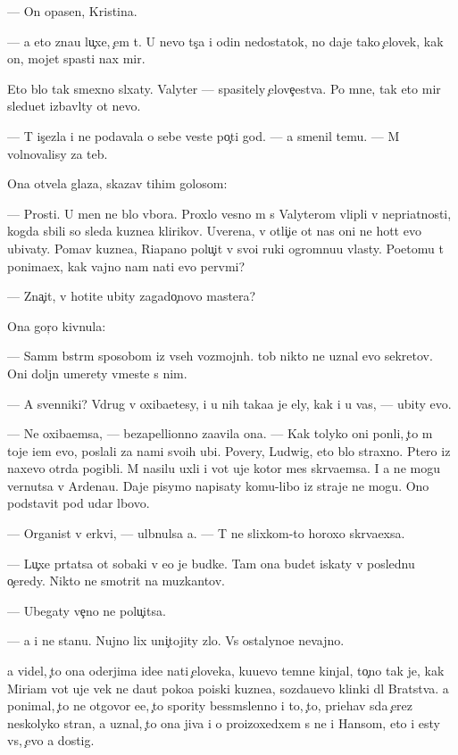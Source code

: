\documentclass[10pt]{book}
\begin{document}
— On opasen, Kristina.

— {\Y}a eto zna{\y}u lu{\c}xe, {\c}em t{\yi}. U nevo t{\yi}s{\ia}{\c}a i odin nedostatok, no daje tako{\y} {\c}elovek, kak on, mojet spasti nax mir.

Eto b{\yi}lo tak smexno sl{\yi}xaty. Valyter — spasitely {\c}elove{\c}estva. Po mne, tak eto mir sledu{\y}et izbavl{\ia}ty ot nevo.

— T{\yi} is{\c}ezla i ne podavala o sebe veste{\y} po{\c}ti god. — {\Y}a smenil temu. — M{\yi} volnovalisy za teb{\ia}.

Ona otvela glaza, skazav tihim golosom:

— Prosti. U men{\ia} ne b{\yi}lo v{\yi}bora. Proxlo{\y} vesno{\y} m{\yi} s Valyterom vlipli v nepri{\y}atnosti, kogda sbili so sleda kuzne{\q}a klirikov. Uverena, v otli{\c}i{\y}e ot nas oni ne hot{\ia}t {\y}evo ubivaty. Po{\y}mav kuzne{\q}a, Riapano polu{\c}it v svo{\y}i ruki ogromnu{\y}u vlasty. Poetomu t{\yi} ponima{\y}ex, kak vajno nam na{\y}ti {\y}evo perv{\yi}mi?

— Zna{\c}it, v{\yi} hotite ubity zagado{\c}novo mastera?

Ona gor{\ia}{\c}o kivnula:

— Sam{\yi}m b{\yi}str{\yi}m sposobom iz vseh vozmojn{\yi}h. {\C}tob{\yi} nikto ne uznal {\y}evo sekretov. Oni doljn{\yi} umerety vmeste s nim.

— A sv{\ia}{\x}enniki? Vdrug v{\yi} oxiba{\y}etesy, i u nih taka{\y}a je {\q}ely, kak i u vas, — ubity {\y}evo.

— Ne oxiba{\y}emsa, — bezapell{\ia}{\q}ionno za{\y}avila ona. — Kak tolyko oni pon{\ia}li, {\c}to m{\yi} toje i{\x}em {\y}evo, poslali za nami svo{\y}ih ubi{\y}{\q}. Povery, Ludwig, eto b{\yi}lo straxno. P{\ia}tero iz naxevo otr{\ia}da pogibli. M{\yi} nasilu uxli i vot uje kotor{\yi}{\y} mes{\ia}{\q} skr{\yi}va{\y}emsa. I {\y}a ne mogu vernutsa v Ardenau. Daje pisymo napisaty komu-libo iz straje{\y} ne mogu. Ono podstavit pod udar l{\iu}bovo.

— Organist v {\q}erkvi, — ul{\yi}bnulsa {\y}a. — T{\yi} ne slixkom-to horoxo skr{\yi}va{\y}exsa.

— Lu{\c}xe pr{\ia}tatsa ot sobaki v {\y}e{\y}o je budke. Tam ona budet iskaty v posledn{\iu}{\y}u o{\c}eredy. Nikto ne smotrit na muz{\yi}kantov.

— Ubegaty ve{\c}no ne polu{\c}itsa.

— {\Y}a i ne stanu. Nujno lix uni{\c}tojity zlo. Vs{\e} ostalyno{\y}e nevajno.

{\Y}a videl, {\c}to ona oderjima ide{\y}e{\y} na{\y}ti {\c}eloveka, ku{\y}u{\x}evo temn{\yi}{\y}e kinjal{\yi}, to{\c}no tak je, kak Miriam vot uje vek ne da{\y}ut poko{\y}a poiski kuzne{\q}a, sozda{\y}u{\x}evo klinki dl{\ia} Bratstva. {\Y}a ponimal, {\c}to ne otgovor{\iu} {\y}e{\y}e, {\c}to spority bessm{\yi}slenno i to, {\c}to, pri{\y}ehav s{\iu}da {\c}erez neskolyko stran, {\y}a uznal, {\c}to ona jiva i o proizoxedxem s ne{\y} i Hansom, eto i {\y}esty vs{\e}, {\c}evo {\y}a dostig.
\end{document}
